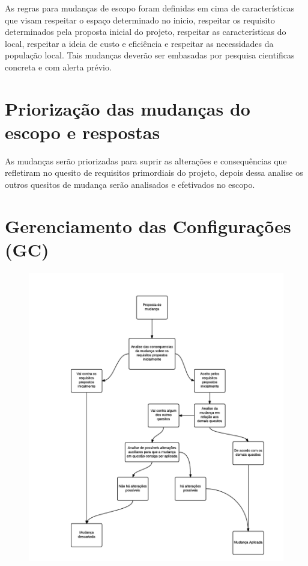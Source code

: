 As regras para mudanças de escopo foram definidas em cima de características que visam respeitar o espaço determinado no inicio, respeitar os requisito determinados pela proposta inicial do projeto, respeitar as características do local, respeitar a ideia de custo e eficiência e respeitar as necessidades da população local. Tais mudanças deverão ser embasadas por pesquisa cientificas concreta e com alerta prévio.

\section{Priorização das mudanças do escopo e respostas}
As mudanças serão priorizadas para suprir as alterações e consequências que refletiram no quesito de requisitos primordiais do projeto, depois dessa analise os outros quesitos de mudança serão analisados e efetivados no escopo.

\section{Gerenciamento das Configurações (GC)}
\begin{figure}[!ht]
\centering
\includegraphics[scale=0.5]{editaveis/figuras/configuracoes}
\label{Rotulo}
\end{figure}
\FloatBarrier


